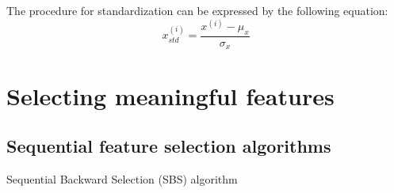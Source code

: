 The procedure for standardization can be expressed by the following equation:
\begin{equation}
    x_{std}^{(i)}=\frac{x^{(i)}-\mu_x}{\sigma_x}
\end{equation}

\section{Selecting meaningful features}
\subsection{Sequential feature selection algorithms}
\begin{algorithm}
    \caption{Sequential Backward Selection (SBS) algorithm}
\end{algorithm}